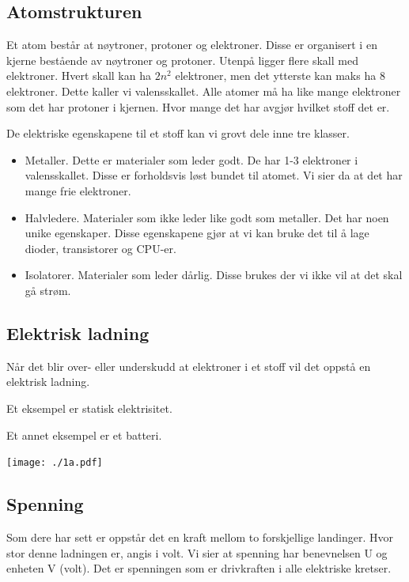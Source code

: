 \documentclass[12pt,a4paper]{article}
\begin{document}
\subsection{Atomstrukturen}

Et atom består at nøytroner, protoner og elektroner. Disse er organisert
i en kjerne bestående av nøytroner og protoner. Utenpå ligger flere
skall med elektroner. Hvert skall kan ha $2n^{2}$ elektroner, men
det ytterste kan maks ha 8 elektroner. Dette kaller vi valensskallet.
Alle atomer må ha like mange elektroner som det har protoner i kjernen.
Hvor mange det har avgjør hvilket stoff det er. 

De elektriske egenskapene til et stoff kan vi grovt dele inne tre
klasser. 
\begin{itemize}
\item Metaller. Dette er materialer som leder godt. De har 1-3 elektroner
i valensskallet. Disse er forholdsvis løst bundet til atomet. Vi sier
da at det har mange frie elektroner. 
\item Halvledere. Materialer som ikke leder like godt som metaller. Det
har noen unike egenskaper. Disse egenskapene gjør at vi kan bruke
det til å lage dioder, transistorer og CPU-er. 
\item Isolatorer. Materialer som leder dårlig. Disse brukes der vi ikke
vil at det skal gå strøm. 
\end{itemize}


\subsection{Elektrisk ladning}

Når det blir over- eller underskudd at elektroner i et stoff vil det
oppstå en elektrisk ladning. 

Et eksempel er statisk elektrisitet.

Et annet eksempel er et batteri. 

\noindent \begin{center}
\texttt{[image: ./1a.pdf]}
\par\end{center}


\subsection{Spenning}

Som dere har sett er oppstår det en kraft mellom to forskjellige landinger.
Hvor stor denne ladningen er, angis i volt. Vi sier at spenning har
benevnelsen U og enheten V (volt). Det er spenningen som er drivkraften
i alle elektriske kretser. 
\end{document}
